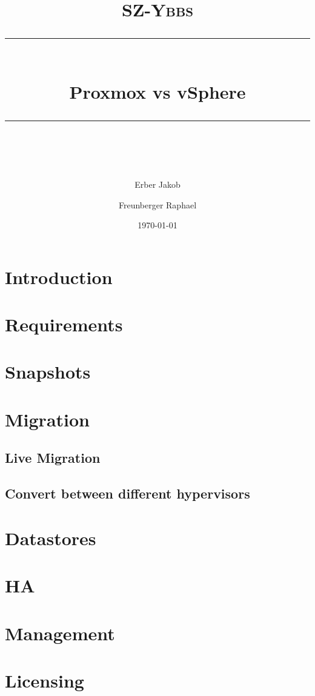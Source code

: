 \documentclass[11pt]{scrartcl} %
\title{	
	\normalfont\normalsize
	\textsc{SZ-Ybbs}\\ %
	\vspace{25pt} %
	\rule{\linewidth}{0.5pt}\\ %
	\vspace{20pt} %
	{\huge Proxmox vs vSphere}\\ %
	\vspace{12pt} %
	\rule{\linewidth}{2pt}\\ %
	\vspace{12pt} %
}
\author{\LARGE Erber Jakob \and \LARGE Freunberger Raphael} %
\date{\normalsize\today} %
\begin{document}
\maketitle %

\section{Introduction}



\section{Requirements}



\section{Snapshots}



\section{Migration}

\subsection{Live Migration}
\subsection{Convert between different hypervisors}

\section{Datastores}

\section{HA}

\section{Management}

\section{Licensing}
\end{document}
